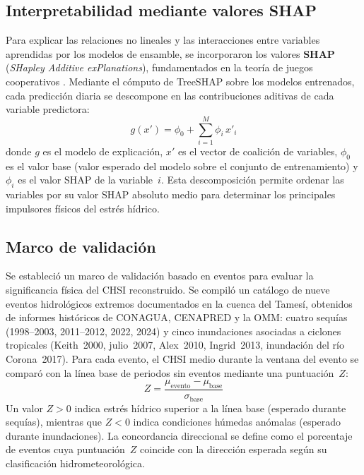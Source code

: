 \documentclass[12pt, a4paper]{article}
\begin{document}
\subsection{Interpretabilidad mediante valores SHAP}
\label{subsec:shap}

Para explicar las relaciones no lineales y las interacciones entre variables aprendidas por los modelos de ensamble, se incorporaron los valores \textbf{SHAP} (\emph{SHapley Additive exPlanations}), fundamentados en la teoría de juegos cooperativos \parencite{lundberg2017unified}. Mediante el cómputo de TreeSHAP sobre los modelos entrenados, cada predicción diaria se descompone en las contribuciones aditivas de cada variable predictora:
%
\begin{equation}
    g(x') = \phi_0 + \sum_{i=1}^{M} \phi_i\, x'_i
    \label{eq:shap}
\end{equation}
%
donde $g$ es el modelo de explicación, $x'$ es el vector de coalición de variables, $\phi_0$ es el valor base (valor esperado del modelo sobre el conjunto de entrenamiento) y $\phi_i$ es el valor SHAP de la variable~$i$. Esta descomposición permite ordenar las variables por su valor SHAP absoluto medio para determinar los principales impulsores físicos del estrés hídrico.

\subsection{Marco de validación}
\label{subsec:validacion}

Se estableció un marco de validación basado en eventos para evaluar la significancia física del CHSI reconstruido. Se compiló un catálogo de nueve eventos hidrológicos extremos documentados en la cuenca del Tamesí, obtenidos de informes históricos de CONAGUA, CENAPRED y la OMM: cuatro sequías (1998--2003, 2011--2012, 2022, 2024) y cinco inundaciones asociadas a ciclones tropicales (Keith~2000, julio~2007, Alex~2010, Ingrid~2013, inundación del río Corona~2017). Para cada evento, el CHSI medio durante la ventana del evento se comparó con la línea base de periodos sin eventos mediante una puntuación~$Z$:
%
\begin{equation}
    Z = \frac{\mu_{\text{evento}} - \mu_{\text{base}}}{\sigma_{\text{base}}}
    \label{eq:zscore}
\end{equation}
%
Un valor $Z > 0$ indica estrés hídrico superior a la línea base (esperado durante sequías), mientras que $Z < 0$ indica condiciones húmedas anómalas (esperado durante inundaciones). La concordancia direccional se define como el porcentaje de eventos cuya puntuación~$Z$ coincide con la dirección esperada según su clasificación hidrometeorológica.
\end{document}
